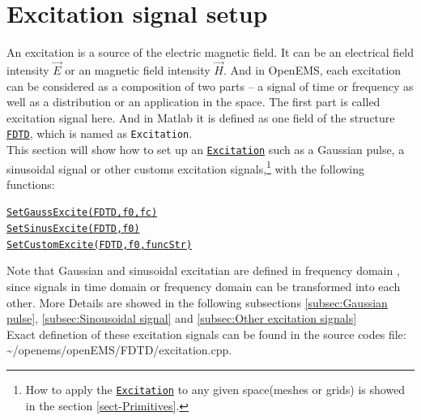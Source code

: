 \section{Excitation signal setup} \label{sec:FDTD_Excitation}
An excitation  is a source of the  electric magnetic field. It can be  an electrical field intensity $\vec{E}$ or an magnetic field intensity $\vec{H}$. And  in OpenEMS, each excitation can be considered as a composition  of two parts -- a signal of  time or  frequency as well as  a distribution or an application in the space. The first part is called excitation signal here. And in Matlab it is defined as one field of the structure \hyperref[para:FDTD]{\texttt{FDTD}}, which is named as \texttt{Excitation}.  \label{para:Excitation}\\%

This section will show how to set up an \hyperref[para:Excitation]{\texttt{Excitation}} such as a Gaussian pulse, a sinusoidal signal or other customs excitation signals,\footnote{How to apply the \hyperref[para:Excitation]{\texttt{Excitation}}  to any given space(meshes or grids) is showed in the section \ref{sect-Primitives}.} with the following functions:
       \begin{myindentpar}
	      \hyperref[func:SetGaussExcite]{\texttt{SetGaussExcite(FDTD,f0,fc)}} \\ 
	      \hyperref[func:SetSinusExcite]{\texttt{SetSinusExcite(FDTD,f0)}}\\ 
	      \hyperref[func:SetCustomExcite]{\texttt{SetCustomExcite(FDTD,f0,funcStr)}}
       \end{myindentpar}
Note that Gaussian and sinusoidal excitatian are defined in frequency domain , since signals in time domain or frequency domain can be transformed into each other.   More Details are showed in the following subsections \ref{subsec:Gaussian pulse}, \ref{subsec:Sinousoidal signal} and \ref{subsec:Other excitation signals}\\
Exact definetion of these excitation signals can be found in the source codes file: \textasciitilde/openems/openEMS/FDTD/excitation.cpp.\\

